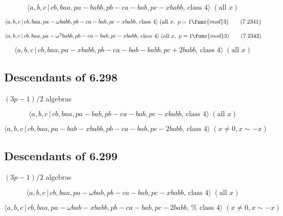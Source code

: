 \documentclass[10pt]{article}
\begin{document}
\begin{equation}
\langle a,b,c\,|\,cb,baa,pa-babb,pb-ca-bab,pc-xbabb,\,\text{class }4\rangle
\;(\text{all }x)  \tag{7.2340}
\end{equation}

\begin{equation}
\langle a,b,c\,|\,cb,baa,pa-\omega babb,pb-ca-bab,pc-xbabb,\,\text{class }%
4\rangle \;(\text{all }x,\;p=1\func{mod}3)  \tag{7.2341}
\end{equation}

\begin{equation}
\langle a,b,c\,|\,cb,baa,pa-\omega ^{2}babb,pb-ca-bab,pc-xbabb,\,\text{class 
}4\rangle \;(\text{all }x,\;p=1\func{mod}3)  \tag{7.2342}
\end{equation}

\begin{equation}
\langle a,b,c\,|\,cb,baa,pa-xbabb,pb-ca-bab-babb,pc+2babb,\,\text{class }%
4\rangle \;(\text{all }x)  \tag{7.2343}
\end{equation}

\subsection{Descendants of 6.298}

$(3p-1)/2$ algebras

\begin{equation}
\langle a,b,c\,|\,cb,baa,pa-bab,pb-ca-bab,pc-xbabb,\,\text{class }4\rangle
\;(\text{all }x)  \tag{7.2344}
\end{equation}

\begin{equation}
\langle a,b,c\,|\,cb,baa,pa-bab-xbabb,pb-ca-bab,pc-2babb,\,\text{class }%
4\rangle \;(x \neq 0, x \sim -x)  \tag{7.2345}
\end{equation}

\subsection{Descendants of 6.299}

$(3p-1)/2$ algebras

\begin{equation}
\langle a,b,c\,|\,cb,baa,pa-\omega bab,pb-ca-bab,pc-xbabb,\,\text{class }%
4\rangle \;(\text{all }x)  \tag{7.2346}
\end{equation}

\begin{equation}
\langle a,b,c\,|\,cb,baa,pa-\omega bab-xbabb,pb-ca-bab,pc-2babb,\,\text{%
class }4\rangle \;(x\neq 0,x\sim -x)  \tag{7.2347}
\end{equation}
\end{document}
